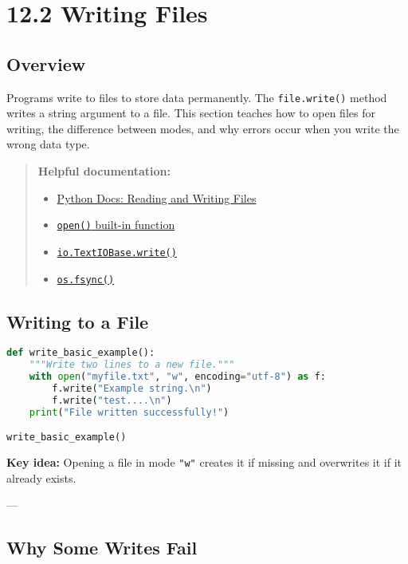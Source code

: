 \chapter{12.2 Writing Files}

\section*{Overview}
Programs write to files to store data permanently.  
The \texttt{file.write()} method writes a string argument to a file.  
This section teaches how to open files for writing, the difference between modes,  
and why errors occur when you write the wrong data type.

\begin{quote}
\textbf{Helpful documentation:}
\begin{itemize}
  \item \href{https://docs.python.org/3/tutorial/inputoutput.html#reading-and-writing-files}{Python Docs: Reading and Writing Files}
  \item \href{https://docs.python.org/3/library/functions.html#open}{\texttt{open()} built-in function}
  \item \href{https://docs.python.org/3/library/io.html#io.TextIOBase.write}{\texttt{io.TextIOBase.write()}}
  \item \href{https://docs.python.org/3/library/os.html#os.fsync}{\texttt{os.fsync()}}
\end{itemize}
\end{quote}

\section{Writing to a File}

\begin{lstlisting}[language=Python, caption={Basic example: Writing text to a file.}]
def write_basic_example():
    """Write two lines to a new file."""
    with open("myfile.txt", "w", encoding="utf-8") as f:
        f.write("Example string.\n")
        f.write("test....\n")
    print("File written successfully!")

write_basic_example()
\end{lstlisting}

\noindent
\textbf{Key idea:} Opening a file in mode \texttt{"w"} creates it if missing and overwrites it if it already exists.

---

\section{Why Some Writes Fail}

